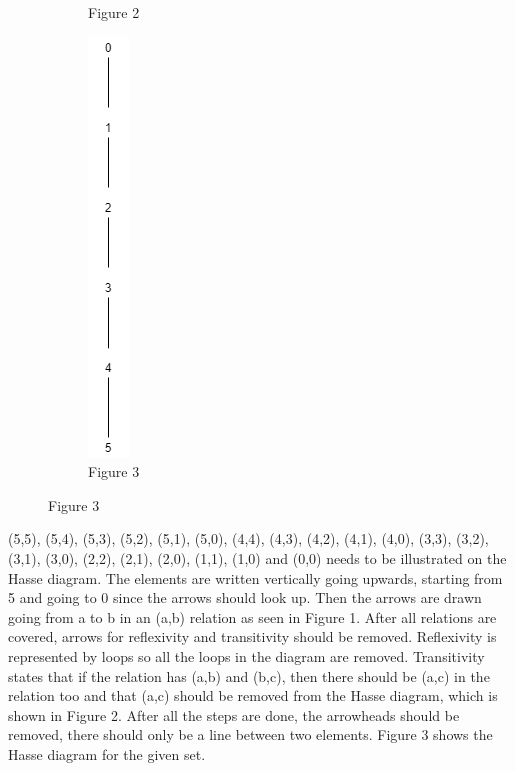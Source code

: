 \documentclass[a4 paper]{article}
\numberwithin{equation}{section}
\newcommand{\0}{\mathbf{0}}
\begin{document}
\begin{figure}[h!]
\begin{subfigure}[b]{0.3\linewidth}
    \caption{Figure 2}
  \end{subfigure}
  \begin{subfigure}[b]{0.3\linewidth}
    \hbox{\hspace{15ex}\includegraphics[width=0.2\linewidth,height=\linewidth]{hasse-3.png}}
    \caption{Figure 3}
  \end{subfigure}
\end{figure}

(5,5), (5,4), (5,3), (5,2), (5,1), (5,0), (4,4), (4,3), (4,2), (4,1), (4,0), (3,3), (3,2), (3,1), (3,0), (2,2), (2,1), (2,0), (1,1), (1,0) and (0,0) needs to be illustrated on the Hasse diagram. The elements are written vertically going upwards, starting from 5 and going to 0 since the arrows should look up. Then the arrows are drawn going from a to b in an (a,b) relation as seen in Figure 1. After all relations are covered, arrows for reflexivity and transitivity should be removed. Reflexivity is represented by loops so all the loops in the diagram are removed. Transitivity states that if the relation has (a,b) and (b,c), then there should be (a,c) in the relation too and that (a,c) should be removed from the Hasse diagram, which is shown in Figure 2. After all the steps are done, the arrowheads should be removed, there should only be a line between two elements. Figure 3 shows the Hasse diagram for the given set.
\end{document}
